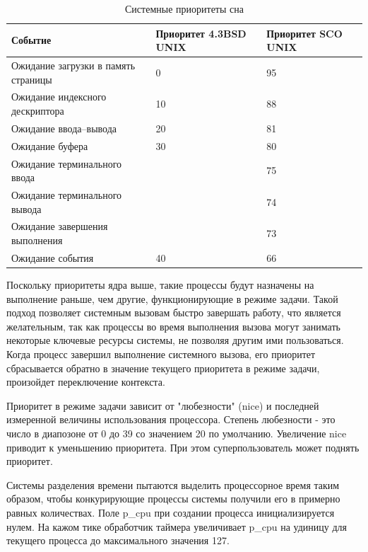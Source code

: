 \documentclass[14pt, a4paper]{extarticle}
\begin{document}
	 \clearpage
	 \begin{table}[h]
	 	\begin{center}
	 		\begin{tabular}{|l|p{65pt}|p{65pt}|} 
	 			\hline
	 			{Событие} & {Приоритет 4.3BSD UNIX} & {Приоритет SCO UNIX}\\
	 			\hline
	 			{Ожидание загрузки в память страницы} & 0 & 95\\
	 			\hline
	 			{Ожидание индексного дескриптора} & 10 & 88\\
	 			\hline
	 			{Ожидание ввода--вывода} & 20 & 81 \\
	 			\hline
	 			{Ожидание буфера} & 30 & 80\\
	 			\hline
	 			{Ожидание терминального ввода} &  & 75\\
	 			\hline
	 			{Ожидание терминального вывода} &  & 74\\
	 			\hline
	 			{Ожидание завершения выполнения} &  & 73\\
	 			\hline
	 			{Ожидание события} & 40 & 66\\
	 			\hline
	 		\end{tabular}
	 	\end{center}
	 	\caption*{Системные приоритеты сна}
	 \end{table}
 	
 	Поскольку приоритеты ядра выше, такие процессы будут назначены на
 	выполнение раньше, чем другие, функционирующие в режиме задачи. Такой
 	подход позволяет системным вызовам быстро завершать работу, что является
 	желательным, так как процессы во время выполнения вызова могут занимать
 	некоторые ключевые ресурсы системы, не позволяя другим ими пользоваться.
 	Когда процесс завершил выполнение системного вызова, его приоритет
 	сбрасывается обратно в значение текущего приоритета в режиме задачи,
 	произойдет переключение контекста.\par
 	
 	Приоритет в режиме задачи зависит от "любезности" (nice) и последней измеренной величины использования процессора. Степень любезности - это число в диапозоне от 0 до 39 со значением 20 по умолчанию. Увеличение nice приводит к уменьшению приоритета. При этом суперпользователь может поднять приоритет.\par
 	
 	Системы разделения времени пытаются выделить процессорное время таким образом, чтобы конкурирующие процессы системы получили его в примерно равных количествах. Поле p\_cpu при создании процесса инициализируется нулем. На кажом тике обработчик таймера увеличивает p\_cpu на удиницу для текущего процесса до
 	максимального значения 127.\par
 	
\end{document}
